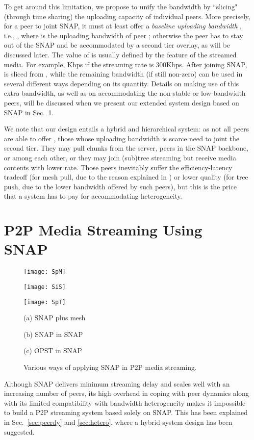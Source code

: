 \documentclass[conference]{IEEEtran}
\begin{document}
  To get around this limitation, we propose to unify the bandwidth by ``slicing" (through time sharing) the uploading capacity of individual peers. More precisely, for a peer  to joint SNAP, it must at least offer a \textit{baseline uploading bandwidth} , i.e., , where  is the uploading bandwidth of peer ; otherwise the peer has to stay out of the SNAP and be accommodated by a second tier overlay, as will be discussed later. The value of  is usually defined by the feature of the streamed media. For example, Kbps if the streaming rate is 300Kbps. After joining SNAP,  is sliced from , while the remaining bandwidth  (if still non-zero) can be used in several different ways depending on its quantity. Details on making use of this extra bandwidth, as well as on accommodating the non-stable or low-bandwidth peers, will be discussed when we present our extended system design based on SNAP in Sec.~\ref{sec:hybpp}.

  We note that our design entails a hybrid and hierarchical system: as not all peers are able to offer , those whose uploading bandwidth is scarce need to joint the second tier. They may pull chunks from the server, peers in the SNAP backbone, or among each other, or they may join (sub)tree streaming but receive media contents with lower rate. Those peers inevitably suffer the efficiency-latency tradeoff (for mesh pull, due to the reason explained in \cite{FengLL-INFOCOM09}) or lower quality (for tree push, due to the lower bandwidth offered by such peers), but this is the price that a system has to pay for accommodating heterogeneity.

\section{P2P Media Streaming Using SNAP} \label{sec:hybpp}
\begin{figure*}[ht]
   \begin{center}
       \parbox{\textwidth}{\parbox{.33\textwidth}{\center\texttt{[image: SpM]}}
                           \parbox{.33\textwidth}{\center\texttt{[image: SiS]}}
                           \parbox{.33\textwidth}{\center\texttt{[image: SpT]}}}
\parbox{\textwidth}{\parbox{.33\textwidth}{\center\scriptsize(a) SNAP plus mesh}
                           \parbox{.33\textwidth}{\center\scriptsize(b) SNAP in SNAP}
                           \parbox{.33\textwidth}{\center\footnotesize(c) OPST in SNAP}}
       \vspace{-2ex}
    \caption{Various ways of applying SNAP in P2P media streaming.}\vspace{-2ex}\label{fig:hybrid}
   \end{center}
  \end{figure*}
Although SNAP delivers minimum streaming delay and scales well with an increasing number of peers, its high overhead in coping with peer dynamics along with its limited compatibility with bandwidth heterogeneity makes it impossible to build a P2P streaming system based solely on SNAP. This has been explained in Sec.~\ref{sec:peerdy} and \ref{sec:hetero}, where a hybrid system design has been suggested.
\end{document}
